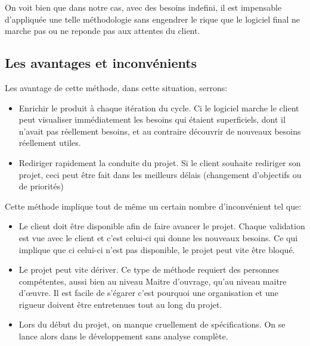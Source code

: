 On voit bien que dans notre cas, avec des besoins indefini, il est impensable d'appliquée une telle méthodologie sans engendrer le rique que le logiciel final ne marche pas ou ne reponde pas aux attentes du client.

\subsection{Les avantages et inconvénients}
Les avantage de cette méthode, dans cette situation, serrons:
\begin{itemize}
    \item Enrichir le produit à chaque itération du cycle. Ci le logiciel marche le client peut visualiser immédiatement les besoins qui étaient superficiels, dont il n'avait pas réellement besoins, et au contraire découvrir de nouveaux besoins réellement utiles.
    \item Rediriger rapidement la conduite du projet. Si le client souhaite rediriger son projet, ceci peut être fait dans les meilleurs délais (changement d'objectifs ou de priorités)
\end{itemize}\medskip
 
Cette méthode implique tout de même un certain nombre d'inconvénient tel que:
\begin{itemize}
    \item Le client doit être disponible afin de faire avancer le projet. Chaque validation est vue avec le client et c'est celui-ci qui donne les nouveaux besoins. Ce qui implique que ci celui-ci n'est pas disponible, le projet peut vite être bloqué. 
    \item Le projet peut vite dériver. Ce type de méthode requiert des personnes compétentes, aussi bien au niveau Maitre d'ouvrage, qu'au niveau maitre d'œuvre. Il est facile de s'égarer c'est pourquoi une organisation et une rigueur doivent être entretenues tout au long du projet.
    \item Lors du début du projet, on manque cruellement de spécifications. On se lance alors dans le développement sans analyse complète.    
\end{itemize}\medskip







    
